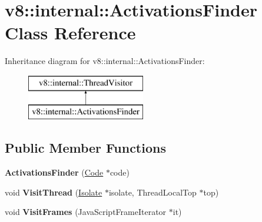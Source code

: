 \hypertarget{classv8_1_1internal_1_1_activations_finder}{}\section{v8\+:\+:internal\+:\+:Activations\+Finder Class Reference}
\label{classv8_1_1internal_1_1_activations_finder}
Inheritance diagram for v8\+:\+:internal\+:\+:Activations\+Finder\+:\begin{figure}[H]
\begin{center}
\leavevmode
\includegraphics[height=2.000000cm]{classv8_1_1internal_1_1_activations_finder}
\end{center}
\end{figure}
\subsection*{Public Member Functions}
\begin{DoxyCompactItemize}
\item 
\hypertarget{classv8_1_1internal_1_1_activations_finder_a60e1f2fc90f683fe1e4d5f1a190dde8f}{}{\bfseries Activations\+Finder} (\hyperlink{classv8_1_1internal_1_1_code}{Code} $\ast$code)\label{classv8_1_1internal_1_1_activations_finder_a60e1f2fc90f683fe1e4d5f1a190dde8f}

\item 
\hypertarget{classv8_1_1internal_1_1_activations_finder_a7eadc771094bec59bd76f6e5ff713a2c}{}void {\bfseries Visit\+Thread} (\hyperlink{classv8_1_1internal_1_1_isolate}{Isolate} $\ast$isolate, Thread\+Local\+Top $\ast$top)\label{classv8_1_1internal_1_1_activations_finder_a7eadc771094bec59bd76f6e5ff713a2c}

\item 
\hypertarget{classv8_1_1internal_1_1_activations_finder_a421dbf4202e15a9c29ed94354ea57a8c}{}void {\bfseries Visit\+Frames} (Java\+Script\+Frame\+Iterator $\ast$it)\label{classv8_1_1internal_1_1_activations_finder_a421dbf4202e15a9c29ed94354ea57a8c}

\end{DoxyCompactItemize}
